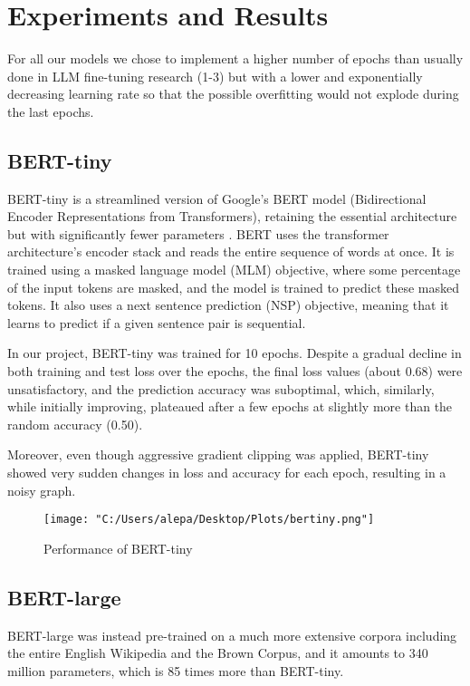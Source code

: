 \documentclass[11pt,twocolumn,letterpaper]{article}
\begin{document}
\section{Experiments and Results}

For all our models we chose to implement a higher number of epochs than usually done in LLM fine-tuning research (1-3) \cite{hoffmann2022training} but with a lower and exponentially decreasing learning rate so that the possible overfitting would not explode during the last epochs.

\subsection{BERT-tiny}
BERT-tiny is a streamlined version of Google's BERT model (Bidirectional Encoder Representations from Transformers), retaining the essential architecture but with significantly fewer parameters \cite{devlin2018bert}. BERT uses the transformer architecture's encoder stack and reads the entire sequence of words at once. It is trained using a masked language model (MLM) objective, where some percentage of the input tokens are masked, and the model is trained to predict these masked tokens. It also uses a next sentence prediction (NSP) objective, meaning that it learns to predict if a given sentence pair is sequential.

In our project, BERT-tiny was trained for 10 epochs. Despite a gradual decline in both training and test loss over the epochs, the final loss values (about 0.68) were unsatisfactory, and the prediction accuracy was suboptimal, which, similarly, while initially improving, plateaued after a few epochs at slightly more than the random accuracy (0.50).

Moreover, even though aggressive gradient clipping was applied, BERT-tiny showed very sudden changes in loss and accuracy for each epoch, resulting in a noisy graph.

\begin{figure}[h]
	\centering
	\texttt{[image: "C:/Users/alepa/Desktop/Plots/bertiny.png"]}
	\caption{Performance of BERT-tiny}
	\label{fig:bert-tiny}
\end{figure}

\subsection{BERT-large}
BERT-large was instead pre-trained on a much more extensive corpora including the entire English Wikipedia and the Brown Corpus, and it amounts to 340 million parameters, which is 85 times more than BERT-tiny. 
\end{document}
